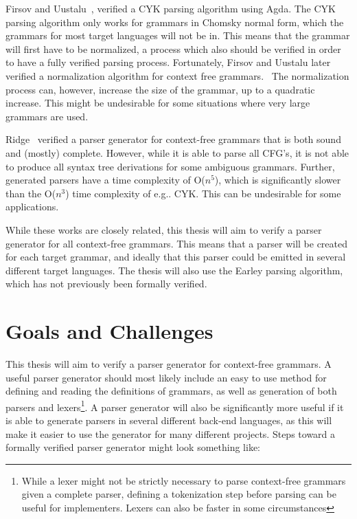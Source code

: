 \documentclass{article}
\begin{document}
	Firsov and Uustalu~\cite{Firsov14}, verified a CYK parsing algorithm using
	Agda. The CYK parsing algorithm only works for grammars in Chomsky normal
	form, which the grammars for most target languages will not be in. This
	means that the grammar will first have to be normalized, a process which
	also should be verified in order to have a fully verified parsing process.
	Fortunately, Firsov and Uustalu later verified a normalization algorithm
	for context free grammars.~\cite{Firsov15} The normalization process can,
	however, increase the size of the grammar, up to a quadratic increase. This
	might be undesirable for some situations where very large grammars are
	used.

	Ridge~\cite{ridge11} verified a parser generator for context-free grammars
	that is both sound and (mostly) complete. However, while it is able to
	parse all CFG's, it is not able to produce all syntax tree derivations for
	some ambiguous grammars. Further, generated parsers have a time complexity
	of O($n^5$), which is significantly slower than the O($n^3$) time
	complexity of e.g.. CYK. This can be undesirable for some applications.

	While these works are closely related, this thesis will aim to verify a
	parser generator for all context-free grammars. This means that a parser
	will be created for each target grammar, and ideally that this parser could
	be emitted in several different target languages. The thesis will also use
	the Earley parsing algorithm, which has not previously been formally
	verified.

\section{Goals and Challenges}


	This thesis will aim to verify a parser generator for context-free
	grammars. A useful parser generator should most likely include an easy to
	use method for defining and reading the definitions of grammars, as well as
	generation of both parsers and lexers\footnote{While a lexer might not be
	strictly necessary to parse context-free grammars given a complete parser,
	defining a tokenization step before parsing can be useful for implementers.
	Lexers can also be faster in some circumstances}. A parser generator will
	also be significantly more useful if it is able to generate parsers in
	several different back-end languages, as this will make it easier to use
	the generator for many different projects.  Steps toward a formally
	verified parser generator might look something like:
\end{document}
